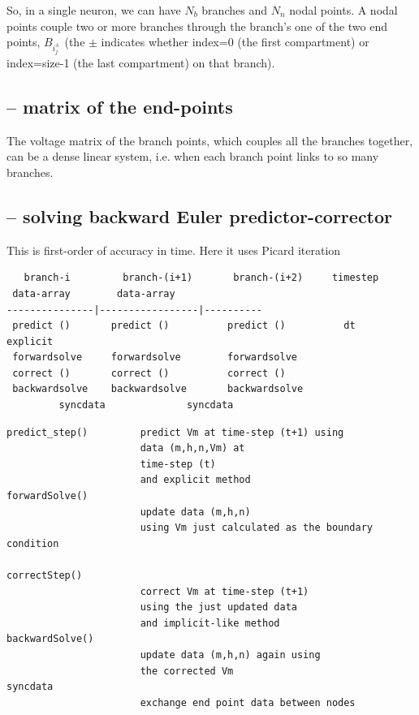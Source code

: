 So, in a single neuron, we can have $N_b$ branches and $N_n$ nodal points. 
A nodal points couple two or more branches through the branch's one of the
two end points, $B_{i^\pm_j}$ (the $\pm$ indicates whether index=0 (the first
compartment) or index=size-1 (the last compartment) on that branch).

\subsection{-- matrix of the end-points}

The voltage matrix of the branch points, which couples all the branches
together, can be a dense linear system, i.e. when each branch point links to so
many branches.



\subsection{-- solving backward Euler predictor-corrector}

This is first-order of accuracy in time. Here it uses Picard iteration


\begin{verbatim}
   branch-i         branch-(i+1)       branch-(i+2)     timestep
 data-array        data-array
---------------|-----------------|----------
 predict ()       predict ()          predict ()          dt        explicit
 forwardsolve     forwardsolve        forwardsolve
 correct ()       correct ()          correct ()
 backwardsolve    backwardsolve       backwardsolve
         syncdata              syncdata
\end{verbatim}

\begin{verbatim}
predict_step() 	       predict Vm at time-step (t+1) using 
                       data (m,h,n,Vm) at
                       time-step (t)
                       and explicit method
forwardSolve()                        
                       update data (m,h,n) 
                       using Vm just calculated as the boundary condition

correctStep()                        
                       correct Vm at time-step (t+1)
                       using the just updated data
                       and implicit-like method
backwardSolve()                       
                       update data (m,h,n) again using
                       the corrected Vm                      
syncdata 
                       exchange end point data between nodes
\end{verbatim}

